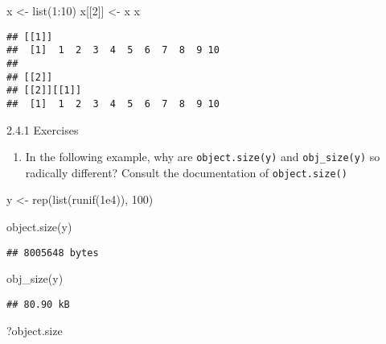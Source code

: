 \documentclass[
]{article}
\newenvironment{Shaded}{\begin{snugshade}}{\end{snugshade}}
\newcommand{\DecValTok}[1]{\textcolor[rgb]{0.00,0.00,0.81}{#1}}
\newcommand{\FloatTok}[1]{\textcolor[rgb]{0.00,0.00,0.81}{#1}}
\newcommand{\FunctionTok}[1]{\textcolor[rgb]{0.00,0.00,0.00}{#1}}
\newcommand{\NormalTok}[1]{#1}
\newcommand{\OtherTok}[1]{\textcolor[rgb]{0.56,0.35,0.01}{#1}}
\newcommand{\SpecialCharTok}[1]{\textcolor[rgb]{0.00,0.00,0.00}{#1}}
\providecommand{\tightlist}{%
  \setlength{\itemsep}{0pt}\setlength{\parskip}{0pt}}
\begin{document}
\begin{Shaded}
\begin{Highlighting}[]
\NormalTok{x }\OtherTok{\textless{}{-}} \FunctionTok{list}\NormalTok{(}\DecValTok{1}\SpecialCharTok{:}\DecValTok{10}\NormalTok{)}
\NormalTok{x[[}\DecValTok{2}\NormalTok{]] }\OtherTok{\textless{}{-}}\NormalTok{ x}
\NormalTok{x}
\end{Highlighting}
\end{Shaded}

\begin{verbatim}
## [[1]]
##  [1]  1  2  3  4  5  6  7  8  9 10
## 
## [[2]]
## [[2]][[1]]
##  [1]  1  2  3  4  5  6  7  8  9 10
\end{verbatim}

2.4.1 Exercises

\begin{enumerate}
\def\labelenumi{\arabic{enumi}.}
\tightlist
\item
  In the following example, why are \texttt{object.size(y)} and
  \texttt{obj\_size(y)} so radically different? Consult the
  documentation of \texttt{object.size()}
\end{enumerate}

\begin{Shaded}
\begin{Highlighting}[]
\NormalTok{y }\OtherTok{\textless{}{-}} \FunctionTok{rep}\NormalTok{(}\FunctionTok{list}\NormalTok{(}\FunctionTok{runif}\NormalTok{(}\FloatTok{1e4}\NormalTok{)), }\DecValTok{100}\NormalTok{)}

\FunctionTok{object.size}\NormalTok{(y)}
\end{Highlighting}
\end{Shaded}

\begin{verbatim}
## 8005648 bytes
\end{verbatim}

\begin{Shaded}
\begin{Highlighting}[]
\FunctionTok{obj\_size}\NormalTok{(y)}
\end{Highlighting}
\end{Shaded}

\begin{verbatim}
## 80.90 kB
\end{verbatim}

\begin{Shaded}
\begin{Highlighting}[]
\NormalTok{?object.size}
\end{Highlighting}
\end{Shaded}
\end{document}
